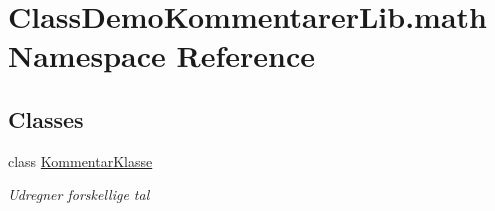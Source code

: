 \hypertarget{namespace_class_demo_kommentarer_lib_1_1math}{}\section{Class\+Demo\+Kommentarer\+Lib.\+math Namespace Reference}
\label{namespace_class_demo_kommentarer_lib_1_1math}
\subsection*{Classes}
\begin{DoxyCompactItemize}
\item 
class \mbox{\hyperlink{class_class_demo_kommentarer_lib_1_1math_1_1_kommentar_klasse}{Kommentar\+Klasse}}
\begin{DoxyCompactList}\small\item\em Udregner forskellige tal \end{DoxyCompactList}\end{DoxyCompactItemize}
